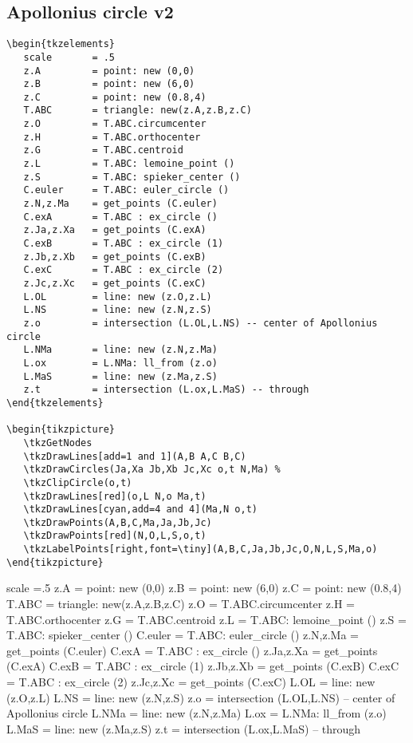 \subsection{Apollonius circle v2} %
\label{sub:apollonius_circle_v2}
\begin{Verbatim}
\begin{tkzelements}
   scale       = .5
   z.A         = point: new (0,0)
   z.B         = point: new (6,0)
   z.C         = point: new (0.8,4)
   T.ABC       = triangle: new(z.A,z.B,z.C)
   z.O         = T.ABC.circumcenter
   z.H         = T.ABC.orthocenter
   z.G         = T.ABC.centroid
   z.L         = T.ABC: lemoine_point ()
   z.S         = T.ABC: spieker_center ()
   C.euler     = T.ABC: euler_circle ()
   z.N,z.Ma    = get_points (C.euler)
   C.exA       = T.ABC : ex_circle ()
   z.Ja,z.Xa   = get_points (C.exA)
   C.exB       = T.ABC : ex_circle (1)
   z.Jb,z.Xb   = get_points (C.exB)
   C.exC       = T.ABC : ex_circle (2)
   z.Jc,z.Xc   = get_points (C.exC)
   L.OL        = line: new (z.O,z.L)
   L.NS        = line: new (z.N,z.S)
   z.o         = intersection (L.OL,L.NS) -- center of Apollonius circle
   L.NMa       = line: new (z.N,z.Ma)
   L.ox        = L.NMa: ll_from (z.o)
   L.MaS       = line: new (z.Ma,z.S)
   z.t         = intersection (L.ox,L.MaS) -- through
\end{tkzelements}

\begin{tikzpicture}
   \tkzGetNodes
   \tkzDrawLines[add=1 and 1](A,B A,C B,C)
   \tkzDrawCircles(Ja,Xa Jb,Xb Jc,Xc o,t N,Ma) %
   \tkzClipCircle(o,t)
   \tkzDrawLines[red](o,L N,o Ma,t)
   \tkzDrawLines[cyan,add=4 and 4](Ma,N o,t)
   \tkzDrawPoints(A,B,C,Ma,Ja,Jb,Jc)
   \tkzDrawPoints[red](N,O,L,S,o,t)
   \tkzLabelPoints[right,font=\tiny](A,B,C,Ja,Jb,Jc,O,N,L,S,Ma,o)
\end{tikzpicture}
\end{Verbatim}

\begin{tkzelements}
scale =.5
z.A    = point: new (0,0)
z.B    = point: new (6,0)
z.C    = point: new (0.8,4)
T.ABC  = triangle: new(z.A,z.B,z.C)
z.O    = T.ABC.circumcenter
z.H    = T.ABC.orthocenter
z.G    = T.ABC.centroid
z.L    = T.ABC: lemoine_point ()
z.S    = T.ABC: spieker_center ()
C.euler    = T.ABC: euler_circle ()
z.N,z.Ma   = get_points (C.euler)
C.exA  = T.ABC : ex_circle ()
z.Ja,z.Xa  = get_points (C.exA)
C.exB  = T.ABC : ex_circle (1)
z.Jb,z.Xb  = get_points (C.exB)
C.exC  = T.ABC : ex_circle (2)
z.Jc,z.Xc  = get_points (C.exC)
L.OL   = line: new (z.O,z.L)
L.NS   = line: new (z.N,z.S)
z.o    = intersection (L.OL,L.NS) -- center of Apollonius circle
L.NMa  = line: new (z.N,z.Ma)
L.ox   = L.NMa: ll_from (z.o)
L.MaS  = line: new (z.Ma,z.S)
z.t    = intersection (L.ox,L.MaS) -- through
\end{tkzelements}

